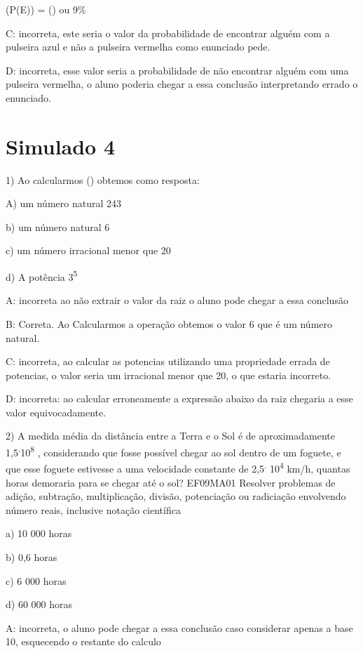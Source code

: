 (P(E)) = () ou 9\%

C: incorreta, este seria o valor da probabilidade de encontrar alguém
com a pulseira azul e não a pulseira vermelha como enunciado pede.

D: incorreta, esse valor seria a probabilidade de não encontrar alguém
com uma pulseira vermelha, o aluno poderia chegar a essa conclusão
interpretando errado o enunciado.

\section{Simulado 4}

1) Ao calcularmos () obtemos como resposta:

A) um número natural 243

b) um número natural 6

c) um número irracional menor que 20

d) A potência 3\textsuperscript{5}

A: incorreta ao não extrair o valor da raiz o aluno pode chegar a essa
conclusão

B: Correta. Ao Calcularmos a operação obtemos o valor 6 que é um número
natural.

C: incorreta, ao calcular as potencias utilizando uma propriedade errada
de potencias, o valor seria um irracional menor que 20, o que estaria
incorreto.

D: incorreta: ao calcular erroneamente a expressão abaixo da raiz
chegaria a esse valor equivocadamente.

2) A medida média da distância entre a Terra e o Sol é de
aproximadamente 1,5\textsuperscript{.}10\textsuperscript{8} ,
considerando que fosse possível chegar ao sol dentro de um foguete, e
que esse foguete estivesse a uma velocidade constante de
2,5\textsuperscript{.} 10\textsuperscript{4} km/h, quantas horas
demoraria para se chegar até o sol? EF09MA01 Resolver problemas de
adição, subtração, multiplicação, divisão, potenciação ou radiciação
envolvendo número reais, inclusive notação científica

a) 10 000 horas

b) 0,6 horas

c) 6 000 horas

d) 60 000 horas

A: incorreta, o aluno pode chegar a essa conclusão caso considerar
apenas a base 10, esquecendo o restante do calculo


